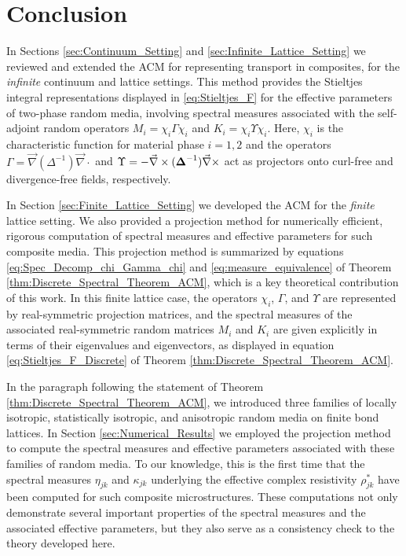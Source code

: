 \documentclass{cmslatex}
\newcommand\bDelta{\mbox{\boldmath${\Delta}$}}
\begin{document}
\section{Conclusion}
%
In Sections \ref{sec:Continuum_Setting} and
\ref{sec:Infinite_Lattice_Setting} we reviewed and extended the ACM for
representing transport in composites, for the \emph{infinite}
continuum and lattice settings. This method provides the Stieltjes
integral representations displayed in \eqref{eq:Stieltjes_F} for the
effective parameters of two-phase random media, involving spectral
measures associated with the self-adjoint random operators
$M_i=\chi_i\Gamma\chi_i$ and $K_i=\chi_i\Upsilon\chi_i$. Here, $\chi_i$ is the characteristic function
for material phase $i=1,2$ and the operators
$\Gamma=\vec{\nabla}(\Delta^{-1})\vec{\nabla}\cdot$ and $\Upsilon=-\vec{\nabla}\times(\bDelta^{-1})\vec{\nabla}\times$
act as projectors onto curl-free and divergence-free fields,
respectively. 






In Section \ref{sec:Finite_Lattice_Setting} we developed the ACM for
the \emph{finite} lattice setting. We also provided a projection
method for numerically efficient, rigorous computation of spectral
measures and effective parameters for such composite media. This
projection method is summarized by equations
\eqref{eq:Spec_Decomp_chi_Gamma_chi} and
\eqref{eq:measure_equivalence} of Theorem
\ref{thm:Discrete_Spectral_Theorem_ACM}, which is a key theoretical
contribution of this work. In this finite lattice case, the operators
$\chi_i$, $\Gamma$, and $\Upsilon$ are represented by real-symmetric projection
matrices, and the spectral measures of the associated real-symmetric
random matrices $M_i$ and $K_i$ are given explicitly in terms of their
eigenvalues and eigenvectors, as displayed in equation
\eqref{eq:Stieltjes_F_Discrete} of Theorem
\ref{thm:Discrete_Spectral_Theorem_ACM}. 



In the paragraph following the statement of Theorem
\ref{thm:Discrete_Spectral_Theorem_ACM}, we introduced three 
families of locally isotropic, statistically isotropic, and
anisotropic random media on finite bond lattices. In Section
\ref{sec:Numerical_Results} we employed the projection method to
compute the spectral measures and effective parameters associated with
these families of random media. To our knowledge, this is the first
time that the spectral measures $\eta_{jk}$ and $\kappa_{jk}$ underlying the
effective complex resistivity $\rho^*_{jk}$ have been computed for such
composite microstructures. These computations not only demonstrate
several important properties of the spectral measures and the
associated effective parameters, but they also serve as a consistency
check to the theory developed here.
\end{document}
